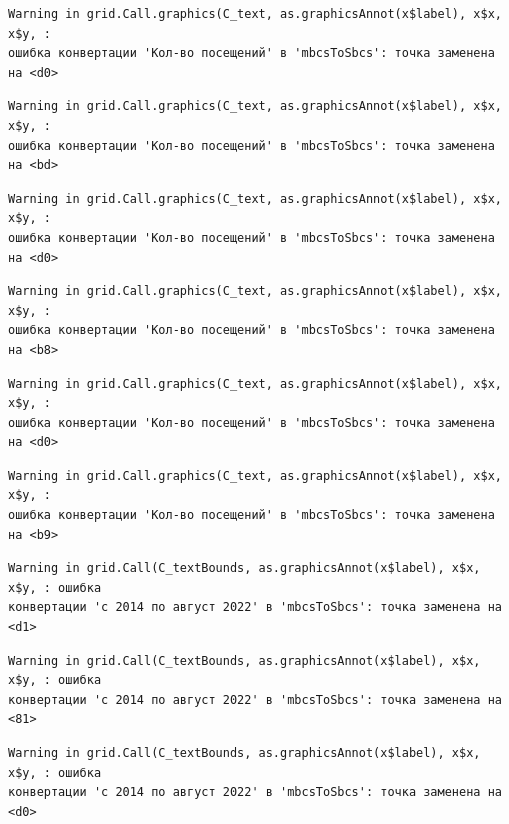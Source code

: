 \documentclass[
  letterpaper,
  DIV=11,
  numbers=noendperiod]{scrreprt}
\begin{document}
\begin{verbatim}
Warning in grid.Call.graphics(C_text, as.graphicsAnnot(x$label), x$x, x$y, :
ошибка конвертации 'Кол-во посещений' в 'mbcsToSbcs': точка заменена на <d0>
\end{verbatim}

\begin{verbatim}
Warning in grid.Call.graphics(C_text, as.graphicsAnnot(x$label), x$x, x$y, :
ошибка конвертации 'Кол-во посещений' в 'mbcsToSbcs': точка заменена на <bd>
\end{verbatim}

\begin{verbatim}
Warning in grid.Call.graphics(C_text, as.graphicsAnnot(x$label), x$x, x$y, :
ошибка конвертации 'Кол-во посещений' в 'mbcsToSbcs': точка заменена на <d0>
\end{verbatim}

\begin{verbatim}
Warning in grid.Call.graphics(C_text, as.graphicsAnnot(x$label), x$x, x$y, :
ошибка конвертации 'Кол-во посещений' в 'mbcsToSbcs': точка заменена на <b8>
\end{verbatim}

\begin{verbatim}
Warning in grid.Call.graphics(C_text, as.graphicsAnnot(x$label), x$x, x$y, :
ошибка конвертации 'Кол-во посещений' в 'mbcsToSbcs': точка заменена на <d0>
\end{verbatim}

\begin{verbatim}
Warning in grid.Call.graphics(C_text, as.graphicsAnnot(x$label), x$x, x$y, :
ошибка конвертации 'Кол-во посещений' в 'mbcsToSbcs': точка заменена на <b9>
\end{verbatim}

\begin{verbatim}
Warning in grid.Call(C_textBounds, as.graphicsAnnot(x$label), x$x, x$y, : ошибка
конвертации 'с 2014 по август 2022' в 'mbcsToSbcs': точка заменена на <d1>
\end{verbatim}

\begin{verbatim}
Warning in grid.Call(C_textBounds, as.graphicsAnnot(x$label), x$x, x$y, : ошибка
конвертации 'с 2014 по август 2022' в 'mbcsToSbcs': точка заменена на <81>
\end{verbatim}

\begin{verbatim}
Warning in grid.Call(C_textBounds, as.graphicsAnnot(x$label), x$x, x$y, : ошибка
конвертации 'с 2014 по август 2022' в 'mbcsToSbcs': точка заменена на <d0>
\end{verbatim}
\end{document}

